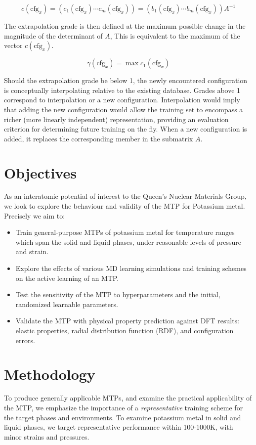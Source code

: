 \documentclass[9pt,twocolumn,twoside]{opticajnl}
\begin{document}
\begin{equation} \label{eq:actLearn}
  c(\textrm{cfg}_x)  = (c_1(\textrm{cfg}_x) \cdots c_m(\textrm{cfg}_x)) = (b_1(\textrm{cfg}_x) \cdots b_m(\textrm{cfg}_x)) A^{-1}
\end{equation}

The extrapolation grade is then defined at the maximum possible change in the magnitude of the determinant of $A$, This is equivalent to the maximum of the vector $c(\textrm{cfg}_x)$.

\begin{equation}
  \gamma(\textrm{cfg}_x) = \max c_1(\textrm{cfg}_x)
\end{equation}

Should the extrapolation grade be below 1, the newly encountered configuration is conceptually interpolating relative to the existing database. Grades above 1 correspond to interpolation or a new configuration. Interpolation would imply that adding the new configuration would allow the training set to encompass a richer (more linearly independent) representation, providing an evaluation criterion for determining future training on the fly. When a new configuration is added, it replaces the corresponding member in the submatrix $A$.

\section{Objectives}
As an interatomic potential of interest to the Queen's Nuclear Materials Group, we look to explore the behaviour and validity of the MTP for Potassium metal. Precisely we aim to:
\begin{itemize}
  \itemsep0em
  \item Train general-purpose MTPs of potassium metal for temperature ranges which span the solid and liquid phases, under reasonable levels of pressure and strain. 
  \item Explore the effects of various MD learning simulations and training schemes on the active learning of an MTP.
  \item  Test the sensitivity of the MTP to hyperparameters and the initial, randomized learnable parameters. 
  \item Validate the MTP with physical property prediction against DFT results: elastic properties, radial distribution function (RDF), and configuration errors.
\end{itemize}

\section{Methodology}
To produce generally applicable MTPs, and examine the practical applicability of the MTP, we emphasize the importance of a \textit{representative} training scheme for the target phases and environments. To examine potassium metal in solid and liquid phases, we target representative performance within 100-1000K, with minor strains and pressures.
\end{document}
